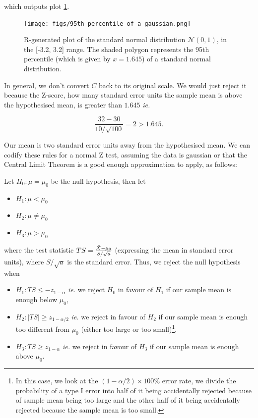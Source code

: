 \documentclass{homework}
\begin{document}
which outputs plot \ref{fig: normal Z test}. 

\begin{figure}
    \centering
    \texttt{[image: figs/95th percentile of a gaussian.png]} 
    \caption{R-generated plot of the standard normal distribution $\mathcal{N}(0,1)$,  in the [-3.2, 3.2] range. The shaded polygon represents the 95th percentile (which is given by $x=1.645$) of a standard normal distribution. }
    \label{fig: normal Z test}
\end{figure}

In general, we don't convert $C$ back to its original scale. We would just reject it because the Z-score, how many standard error units the sample mean is above the hypothesised mean, is greater than $1.645$ \textit{ie. }

$$
\frac{32-30}{10/\sqrt{100}} = 2 > 1.645.
$$

Our mean is two standard error units away from the hypothesised mean. We can codify these rules for a normal Z test, assuming the data is gaussian or that the Central Limit Theorem is a good enough approximation to apply, as follows:

\begin{tcolorbox}[title=Rules for a normal Z-test]

Let $H_0 : \mu = \mu_0$ be the null hypothesis, then let 
\begin{itemize}
    \item $H_1: \mu < \mu_0$
    \item $H_2: \mu \neq \mu_0$
    \item $H_3: \mu > \mu_0$
\end{itemize}

where the test statistic $TS = \frac{\Bar{X}-\mu_0}{S/\sqrt{a}}$ (expressing the mean in standard error units), where $S/\sqrt{a}$ is the standard error. Thus, we reject the null hypothesis when 

\begin{itemize}
    \item $H_1: TS \leq -z_{1-\alpha}$ \textit{ie.} we reject $H_0$ in favour of $H_1$ if our sample mean is enough below $\mu_0$,
    \item $H_2: |TS| \geq  z_{1-\alpha/2}$ \textit{ie.} we reject in favour of $H_2$ if our sample mean is enough too different from $\mu_0$ (either too large or too small)\footnote{In this case, we look at the $(1-\alpha/2)\times 100\%$ error rate, we divide the probability of a type I error into half of it being accidentally rejected because of sample mean being too large and the other half of it being accidentally rejected because the sample mean is too small. }, 
    \item $H_3: TS \geq z_{1-\alpha}$ \textit{ie.} we reject in favour of $H_3$ if our sample mean is enough above $\mu_0$.
\end{itemize}
\end{tcolorbox}
\end{document}
